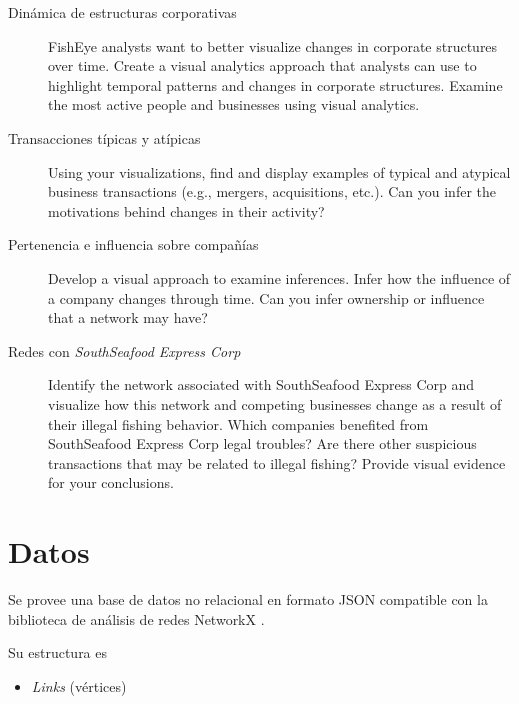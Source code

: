 \documentclass[11pt,spanish,a4paper]{article}
\begin{document}
\begin{description}
	\item[Dinámica de estructuras corporativas]
    FishEye analysts want to better visualize changes in corporate structures over time. Create a visual analytics approach that analysts can use to highlight temporal patterns and changes in corporate structures. Examine the most active people and businesses using visual analytics.
	\item[Transacciones típicas y atípicas]
    Using your visualizations, find and display examples of typical and atypical business transactions (e.g., mergers, acquisitions, etc.). Can you infer the motivations behind changes in their activity?
	\item[Pertenencia e influencia sobre compañías]
		Develop a visual approach to examine inferences. Infer how the influence of a company changes through time. Can you infer ownership or influence that a network may have?
	\item[Redes con \emph{SouthSeafood Express Corp}]
    Identify the network associated with SouthSeafood Express Corp and visualize how this network and competing businesses change as a result of their illegal fishing behavior. Which companies benefited from SouthSeafood Express Corp legal troubles? Are there other suspicious transactions that may be related to illegal fishing? Provide visual evidence for your conclusions.
\end{description}


\section{Datos}
Se provee una base de datos no relacional en formato JSON compatible con la biblioteca de análisis de redes NetworkX \cite{noauthor_networkx_nodate}.

Su estructura es
\begin{itemize}
	\item \emph{Links} (vértices) 
\end{itemize}
\end{document}
